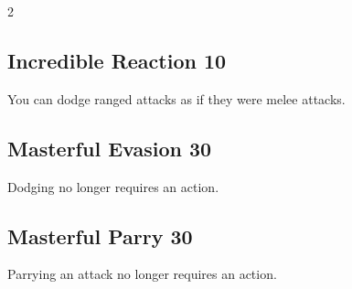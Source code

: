 \begin{multicols}{2}
\begin{tcolorbox}
\vspace{3mm}



\end{tcolorbox}

\begin{tcolorbox}
    \subsection*{Incredible Reaction \hfill \small{10 }}
    \tcblower
You can dodge ranged attacks as if they were melee attacks.


\vspace{3mm}



\end{tcolorbox}

\begin{tcolorbox}
    \subsection*{Masterful Evasion \hfill \small{30 }}
    \tcblower
Dodging no longer requires an action.


\vspace{3mm}



\end{tcolorbox}

\begin{tcolorbox}
    \subsection*{Masterful Parry \hfill \small{30 }}
    \tcblower
Parrying an attack no longer requires an action.


\vspace{3mm}




\end{tcolorbox}
\end{multicols}
